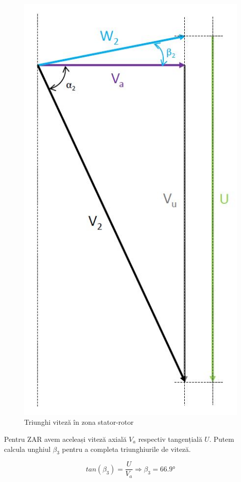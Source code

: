 \begin{figure}[h!]
	\centering
	\includegraphics[scale=0.5]{figures/triunghi_viteza_ZSR.jpg}
	\caption{Triunghi viteză în zona stator-rotor}
	\label{Triunghi viteză în zona stator-rotor}
\end{figure}



Pentru ZAR avem aceleași viteză axială $V_a$ respectiv tangențială $U$. Putem calcula unghiul $\beta_3$ pentru a completa triunghiurile de viteză.

\begin{equation}
tan(\beta_{3})=\frac{U}{V_a} \Rightarrow \beta_{3} =66.9\si{\degree}
\end{equation}

